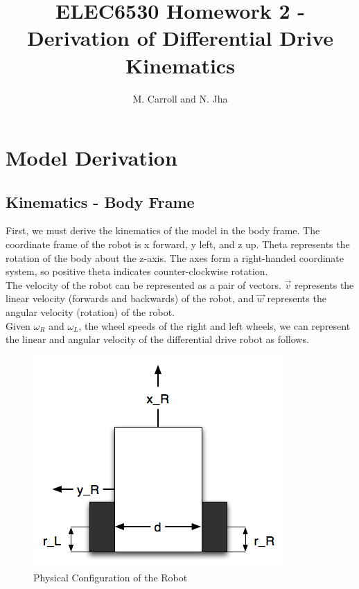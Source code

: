 \documentclass[10pt]{amsart}
\title{ELEC6530 Homework 2 - Derivation of Differential Drive Kinematics}
\author{M. Carroll and N. Jha}
\date{}
\begin{document}
\maketitle

\section{Model Derivation}
\subsection{Kinematics - Body Frame}
\begin{par}
First, we must derive the kinematics of the model in the body frame.  The coordinate frame of the robot is x forward, y left, and z up.  Theta represents the rotation of the body about the z-axis.  
The axes form a right-handed coordinate system, so positive theta indicates counter-clockwise rotation.\\

The velocity of the robot can be represented as a pair of vectors.  $\vec{v}$ represents the linear velocity (forwards and backwards) of the robot, and $\vec{w}$ represents the angular velocity (rotation)
of the robot.\\

Given $\omega_{R}$ and $\omega_{L}$, the wheel speeds of the right and left wheels, we can represent the linear and angular velocity of the differential drive robot as follows.\\
\end{par}
\begin{figure}[h]
 \centering
 \includegraphics[scale=0.5,keepaspectratio=true]{./robot.png}
 \caption{Physical Configuration of the Robot}
 \label{fig:robotparams}
\end{figure}
\end{document}
